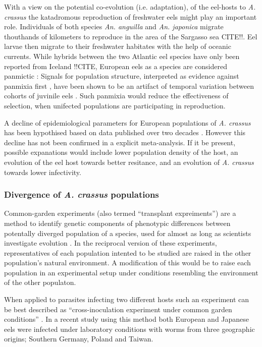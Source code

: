With a view on the potential co-evolution (i.e. adaptation), of the
eel-hosts to \textit{A. crassus} the katadromous reproduction of
freshwater eels might play an important role. Individuals of both
species \textit{An. anguilla} and \textit{An. japonica} migrate
thouthands of kilometers to reproduce in the area of the Sargasso sea
CITE!!. Eel larvae then migrate to their freshwater habitates with the
help of oceanic currents. While hybrids between the two Atlantic eel
species have only been reported from Iceland !!CITE, European eels as
a species are considered panmictic \cite{pmid20735687}: Signals for
population structure, interpreted as evidence against panmixia first
\cite{pmid11234011}, have been shown to be an artifact of temporal
variation between cohorts of juvinile eels \cite{pmid19417764,
  pmid21299662, pmid16024374}. Such panmixia would reduce the
effectiveness of selection, when unifected populations are
participating in reproduction.

A decline of epidemiological parameters for European populations of
\textit{A. crassus} has been hypothised based on data published over
two decades \cite{lefebvre_anguillicolosis:_2004}. However this
decline has not been confirmed in a explicit meta-analysis. If it be
present, possible expanations would include lower population density
of the host, an evolution of the eel host towards better resitance,
and an evolution of \textit{A. crassus} towards lower infectivity.

\subsubsection{Divergence of \textit{A. crassus} populations}
\label{div-ac}

Common-garden experiments (also termed ``transplant expreiments'') are
a method to identify genetic components of phenotypic differences
between potentally diverged population of a species, used for almost
as long as scientists investigate evolution
\cite{kerner_classic_common_garden, bonnier_classic_common_garden}. In
the reciprocal version of these experiments, representatives of each
population intented to be studied are raised in the other population's
natural environment. A modification of this would be to raise each
population in an experimental setup under conditions resembling the
environment of the other populaton.

When applied to parasites infecting two different hosts such an
experiment can be best described as ``cross-inoculation experiment
under common garden conditions'' \cite{kaltz_shykoff_rev}. In a recent
study using this method both European and Japanese eels were infected
under laboratory conditions with worms from three geographic origins;
Southern Germany, Poland and Taiwan.

